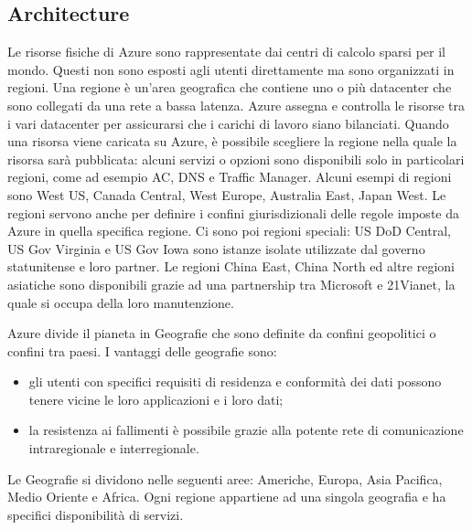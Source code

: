 \subsection{Architecture}
Le risorse fisiche di Azure sono rappresentate dai centri di calcolo sparsi per il mondo. Questi non sono esposti agli utenti direttamente ma sono organizzati in regioni. Una regione è un'area geografica che contiene uno o più datacenter che sono collegati da una rete a bassa latenza. Azure assegna e controlla le risorse tra i vari datacenter per assicurarsi che i carichi di lavoro siano bilanciati. Quando una risorsa viene caricata su Azure, è possibile scegliere la regione nella quale la risorsa sarà pubblicata: alcuni servizi o opzioni sono disponibili solo in particolari regioni, come ad esempio AC, DNS e Traffic Manager. Alcuni esempi di regioni sono West US, Canada Central, West Europe, Australia East, Japan West. Le regioni servono anche per definire i confini giurisdizionali delle regole imposte da Azure in quella specifica regione. Ci sono poi regioni speciali: US DoD Central, US Gov Virginia e US Gov Iowa sono istanze isolate utilizzate dal governo statunitense e loro partner. Le regioni China East, China North ed altre regioni asiatiche sono disponibili grazie ad una partnership tra Microsoft e 21Vianet, la quale si occupa della loro manutenzione.

Azure divide il pianeta in Geografie che sono definite da confini geopolitici o confini tra paesi. I vantaggi delle geografie sono:
\begin{itemize}
    \item gli utenti con specifici requisiti di residenza e conformità dei dati possono tenere vicine le loro applicazioni e i loro dati;
    \item la resistenza ai fallimenti è possibile grazie alla potente rete di comunicazione intraregionale e interregionale.
\end{itemize}
Le Geografie si dividono nelle seguenti aree: Americhe, Europa, Asia Pacifica, Medio Oriente e Africa. Ogni regione appartiene ad una singola geografia e ha specifici disponibilità di servizi.

